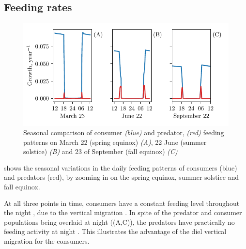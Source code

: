 \subsection{Feeding rates}
\begin{figure}[H]
\includegraphics{plots/growth_short_rational.pdf}
\caption{Seasonal comparison of consumer \emph{(blue)} and predator, \emph{(red)} feeding patterns on March 22 (spring equinox) \emph{(A)}, 22 June (summer solstice) \emph{(B)} and 23 of September (fall equinox) \emph{(C)}}
\label{fig:growth_short_rational}
\end{figure}
 shows the seasonal variations in the daily feeding patterns of consumers (blue) and predators (red), by zooming in on the spring equinox, summer solstice and fall equinox.

At all three points in time, consumers have a constant feeding level throughout the night , due to the vertical migration . In spite of the predator and consumer populations being overlaid at night ((A,C)), the predators have practically no feeding activity at night . This illustrates the advantage of the diel vertical migration for the consumers.

